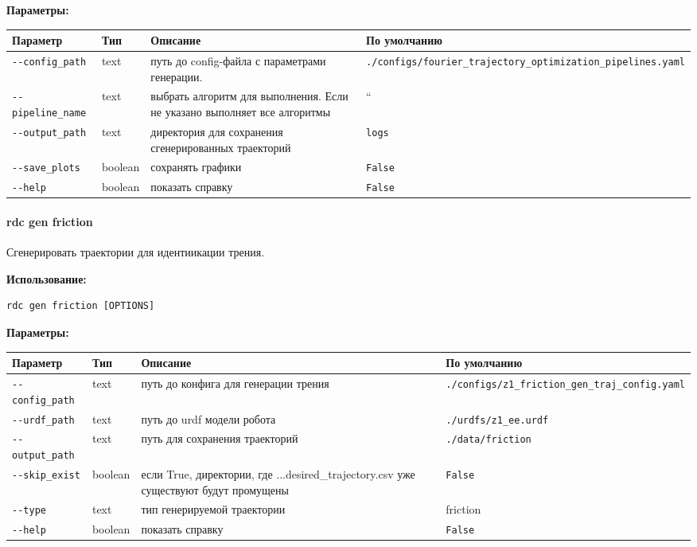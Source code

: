\textbf{Параметры:}
\begin{center}
\fontsize{10pt}{10pt}\selectfont
\begin{longtable}[]{p{5cm}|p{2cm}|p{3.5cm}|p{5cm}}
    \hline
\toprule()
Параметр & Тип & Описание & По умолчанию \\
\hline
\midrule()
\endhead
\texttt{-\/-config\_path} & text & путь до config-файла с параметрами генерации. &
\texttt{./configs/fourier\_trajectory\_optimization\_pipelines.yaml} \\
\hline
\texttt{-\/-pipeline\_name} & text & выбрать алгоритм для выполнения. Если не указано выполняет все алгоритмы & `` \\
\hline
\texttt{-\/-output\_path} & text & директория для сохранения сгенерированных траекторий & \texttt{logs} \\
\hline
\texttt{-\/-save\_plots} & boolean & сохранять графики &
\texttt{False} \\
\hline
\texttt{-\/-help} & boolean & показать справку &
\texttt{False} \\
\hline
\bottomrule()
\hline
\end{longtable}
\end{center}

\hypertarget{rdc-gen-friction}{%
\paragraph{rdc gen friction}\label{rdc-gen-friction}}

Сгенерировать траектории для идентиикации трения.

\textbf{Использование:}
\begin{lstlisting}[language=python, numbers=none, frame=single]
rdc gen friction [OPTIONS]
\end{lstlisting}

\textbf{Параметры:}
\begin{center}
\fontsize{10pt}{10pt}\selectfont
\begin{longtable}[]{p{5cm}|p{2cm}|p{3.5cm}|p{5cm}}
    \hline
\toprule()
Параметр & Тип & Описание & По умолчанию \\
\hline
\midrule()
\endhead
\texttt{-\/-config\_path} & text & путь до конфига для генерации трения &
\texttt{./configs/z1\_friction\_gen\_traj\_config.yaml} \\
\hline
\texttt{-\/-urdf\_path} & text & путь до urdf модели робота&
\texttt{./urdfs/z1\_ee.urdf} \\
\hline
\texttt{-\/-output\_path} & text & путь для сохранения траекторий &
\texttt{./data/friction} \\
\hline
\texttt{-\/-skip\_exist} & boolean & если True, директории, где ...desired\_trajectory.csv уже существуют будут промущены & \texttt{False} \\
\hline
\texttt{-\/-type} & text & тип генерируемой траектории & friction \\
\hline
\texttt{-\/-help} & boolean & показать справку &
\texttt{False} \\
\bottomrule()
\hline
\end{longtable}
\end{center}


